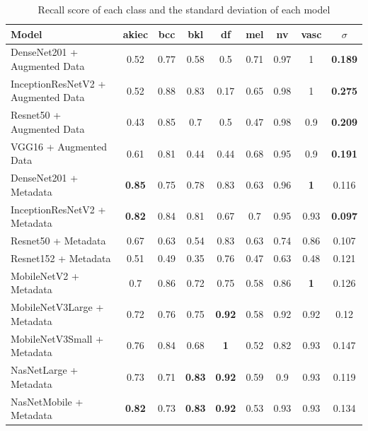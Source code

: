 \begin{table}[h]
	\centering
	\begin{tabular}{|l | c | c | c | c | c | c | c | c|} 
		\hline
		Model & akiec & bcc & bkl & df & mel & nv & vasc & $\sigma$ \\
		\hline
		DenseNet201 + Augmented Data & 0.52 & 0.77 & 0.58 & 0.5 & 0.71 & 0.97 & 1 & \textbf{0.189}\\ 
		\hline
		InceptionResNetV2 + Augmented Data & 0.52 & 0.88 & 0.83 & 0.17 & 0.65 & 0.98 & 1 & \textbf{0.275}\\
		\hline
		Resnet50 + Augmented Data & 0.43 & 0.85 & 0.7 & 0.5 & 0.47 & 0.98 & 0.9 & \textbf{0.209}\\
		\hline 	
		VGG16 + Augmented Data & 0.61 & 0.81 & 0.44 & 0.44 & 0.68 & 0.95 & 0.9 & 	\textbf{0.191}\\ 
		\hline		
		DenseNet201 + Metadata & \textbf{0.85} & 0.75 & 0.78 & 0.83 & 0.63 & 0.96 & \textbf{1} & 0.116\\
		\hline
		InceptionResNetV2 + Metadata & \textbf{0.82} & 0.84 & 0.81 & 0.67 & 0.7 & 0.95 & 	0.93 & \textbf{0.097}\\
		\hline
		Resnet50 + Metadata & 0.67 & 0.63 & 0.54 & 0.83 & 0.63 & 0.74 & 0.86 & 0.107\\
		\hline
		Resnet152 + Metadata & 0.51 & 0.49 & 0.35 & 0.76 & 0.47 & 0.63 & 0.48 & 0.121\\
		\hline
		MobileNetV2 + Metadata & 0.7 & 0.86 & 0.72 & 0.75 & 0.58 & 0.86 & \textbf{1} & 0.126\\
		\hline
		MobileNetV3Large + Metadata & 0.72 & 0.76 & 0.75 & \textbf{0.92} & 0.58 & 0.92 & 0.92 & 0.12\\
		\hline
		MobileNetV3Small + Metadata & 0.76 & 0.84 & 0.68 & \textbf{1} & 0.52 & 0.82 & 0.93 & 0.147\\
		\hline
		NasNetLarge + Metadata & 0.73 & 0.71 & \textbf{0.83} & \textbf{0.92} & 0.59 & 0.9 & 0.93 & 0.119\\
		\hline
		NasNetMobile + Metadata & \textbf{0.82} & 0.73 & \textbf{0.83} & \textbf{0.92} & 0.53 & 0.93 & 0.93 & 0.134\\
		\hline
	\end{tabular}
	\caption{Recall score of each class and the standard deviation of each model}
	\label{table:6}
\end{table}
\FloatBarrier
\FloatBarrier
